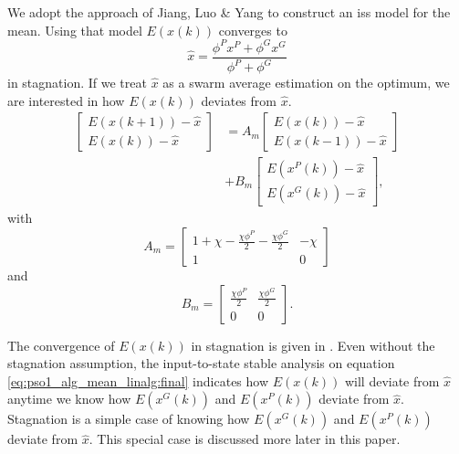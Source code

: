 \documentclass{sig-alternate}
\begin{document}
We adopt the approach of Jiang, Luo \& Yang \cite{Jiang20078} to construct an iss model for the mean.
Using that model $ E( x(k) ) $ converges to 
\begin{equation}
\nonumber
\hat{x} = \frac{\phi^{P} x^{P} + \phi^{G} x^{G} }{ \phi^{P} + \phi^{G} } 
\end{equation}
in stagnation.
If we treat $ \hat{x} $ as a swarm average estimation on the optimum, we are interested in how $ E( x(k) ) $ deviates from $ \hat{x} $.
\begin{equation}
\label{eq:pso1_alg_mean_linalg:final}
\begin{aligned}
\begin{bmatrix}
E( x(k+1) ) - \hat{x} \\
E( x(k) ) - \hat{x}
\end{bmatrix}
& = 
A_{m}
\begin{bmatrix}
E( x(k) ) - \hat{x} \\
E( x(k-1) ) - \hat{x}
\end{bmatrix}
\\ & +
B_{m}
\begin{bmatrix}
E( x^{P}(k) ) - \hat{x}\\
E( x^{G}(k) ) - \hat{x}
\end{bmatrix},
\end{aligned}
\end{equation}
with 
\begin{equation}
\nonumber
A_{m} = \begin{bmatrix}
1 + \chi - \frac{ \chi \phi^{P} }{2} - \frac{ \chi \phi^{G} }{2} & -\chi \\
1 & 0
\end{bmatrix}
\end{equation}
and
\begin{equation}
\nonumber
B_{m} = \begin{bmatrix}
\frac{ \chi \phi^{P} }{2} & \frac{ \chi \phi^{G} }{2} \\
0 & 0
\end{bmatrix}.
\end{equation}

The convergence of $ E( x(k) ) $ in stagnation is given in \cite{Jiang20078,Poli:2008:DSS:1384929.1384944}.
Even without the stagnation assumption, 
the input-to-state stable analysis on equation \eqref{eq:pso1_alg_mean_linalg:final} indicates how $ E(x(k)) $ will deviate from $ \hat{x} $ anytime we know how $ E( x^{G}(k) ) $ and $ E( x^{P}(k) ) $ deviate from $ \hat{x} $. Stagnation is a simple case of knowing how $ E( x^{G}(k) ) $ and $ E( x^{P}(k) ) $ deviate from $ \hat{x} $. This special case is discussed more later in this paper.
\end{document}
